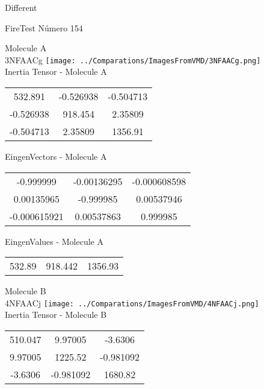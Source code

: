 \begin{center}
\vtab
\vtab
\textcolor{NavyBlue}{\Large Different}
\end{center}

 \newpage

\vtab[-2cm]
\begin{center}
{\large FireTest \tab Número 154}
\end{center}
\begin{multicols}{2}
\begin{center}

Molecule A \\ 
3NFAACg
\texttt{[image: ../Comparations/ImagesFromVMD/3NFAACg.png]}
\\
Inertia Tensor - Molecule A \\
\vtab

\begin{tabular}{|c c c|}
532.891	 & 	-0.526938	 & 	-0.504713	 \\
-0.526938	 & 	918.454	 & 	2.35809	 \\
-0.504713	 & 	2.35809	 & 	1356.91
\end{tabular}

\vtab
 EingenVectors - Molecule A     \\
\vtab
\begin{tabular}{|c c c|}
-0.999999	 & 	-0.00136295	 & 	-0.000608598	 \\
0.00135965	 & 	-0.999985	 & 	0.00537946	 \\
-0.000615921	 & 	0.00537863	 & 	0.999985
\end{tabular}

\vtab
 EingenValues - Molecule A     \\
\vtab
\begin{tabular}{|c c c|}
532.89	 & 	918.442	 & 	1356.93	 \\
\end{tabular}
\columnbreak

Molecule B \\ 
4NFAACj
\texttt{[image: ../Comparations/ImagesFromVMD/4NFAACj.png]}
\\
Inertia Tensor - Molecule B \\
\vtab

\begin{tabular}{|c c c|}
510.047	 & 	9.97005	 & 	-3.6306	 \\
9.97005	 & 	1225.52	 & 	-0.981092	 \\
-3.6306	 & 	-0.981092	 & 	1680.82
\end{tabular}


\end{center}
\end{multicols}
